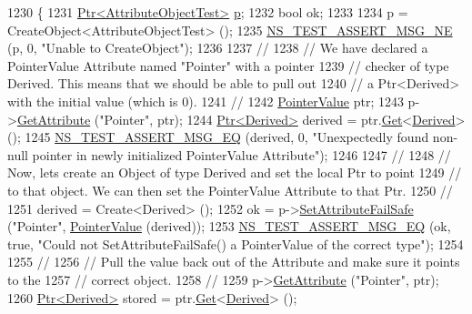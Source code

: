\begin{DoxyCode}
1230 \{
1231   \hyperlink{classns3_1_1Ptr}{Ptr<AttributeObjectTest>} \hyperlink{lte__link__budget_8m_ac9de518908a968428863f829398a4e62}{p};
1232   \textcolor{keywordtype}{bool} ok;
1233 
1234   p = CreateObject<AttributeObjectTest> ();
1235   \hyperlink{group__testing_ga73d66fb0050a5111453fd144e767b91a}{NS\_TEST\_ASSERT\_MSG\_NE} (p, 0, \textcolor{stringliteral}{"Unable to CreateObject"});
1236 
1237   \textcolor{comment}{//}
1238   \textcolor{comment}{// We have declared a PointerValue Attribute named "Pointer" with a pointer}
1239   \textcolor{comment}{// checker of type Derived.  This means that we should be able to pull out}
1240   \textcolor{comment}{// a Ptr<Derived> with the initial value (which is 0).}
1241   \textcolor{comment}{//}
1242   \hyperlink{classns3_1_1PointerValue}{PointerValue} ptr;
1243   p->\hyperlink{classns3_1_1ObjectBase_a895d1de2f96063d0e0fd78463e7a7e30}{GetAttribute} (\textcolor{stringliteral}{"Pointer"}, ptr);
1244   \hyperlink{classns3_1_1Ptr}{Ptr<Derived>} derived = ptr.\hyperlink{classns3_1_1PointerValue_ae8e90fe3c0810cd6e4e1b1ba31f52a66}{Get}<\hyperlink{classDerived}{Derived}> ();
1245   \hyperlink{group__testing_ga2a9d78cffb3db8e867c35fff0b698cf5}{NS\_TEST\_ASSERT\_MSG\_EQ} (derived, 0, \textcolor{stringliteral}{"Unexpectedly found non-null pointer in newly
       initialized PointerValue Attribute"});
1246 
1247   \textcolor{comment}{//}
1248   \textcolor{comment}{// Now, lets create an Object of type Derived and set the local Ptr to point}
1249   \textcolor{comment}{// to that object.  We can then set the PointerValue Attribute to that Ptr.}
1250   \textcolor{comment}{//}
1251   derived = Create<Derived> ();
1252   ok = p->\hyperlink{classns3_1_1ObjectBase_aa7d333004e970f925a4ed5df275541b5}{SetAttributeFailSafe} (\textcolor{stringliteral}{"Pointer"}, \hyperlink{classns3_1_1PointerValue}{PointerValue} (derived));
1253   \hyperlink{group__testing_ga2a9d78cffb3db8e867c35fff0b698cf5}{NS\_TEST\_ASSERT\_MSG\_EQ} (ok, \textcolor{keyword}{true}, \textcolor{stringliteral}{"Could not SetAttributeFailSafe() a PointerValue of
       the correct type"});
1254 
1255   \textcolor{comment}{//}
1256   \textcolor{comment}{// Pull the value back out of the Attribute and make sure it points to the}
1257   \textcolor{comment}{// correct object.}
1258   \textcolor{comment}{//}
1259   p->\hyperlink{classns3_1_1ObjectBase_a895d1de2f96063d0e0fd78463e7a7e30}{GetAttribute} (\textcolor{stringliteral}{"Pointer"}, ptr);
1260   \hyperlink{classns3_1_1Ptr}{Ptr<Derived>} stored = ptr.\hyperlink{classns3_1_1PointerValue_ae8e90fe3c0810cd6e4e1b1ba31f52a66}{Get}<\hyperlink{classDerived}{Derived}> ();

\end{DoxyCode}
